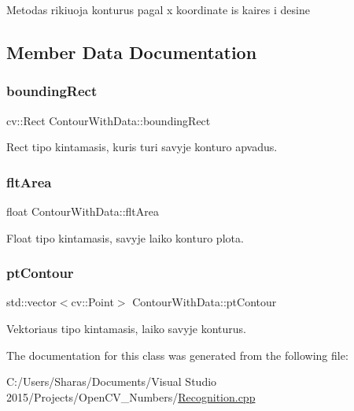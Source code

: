 Metodas rikiuoja konturus pagal x koordinate is kaires i desine 

\subsection{Member Data Documentation}
\mbox{\label{class_contour_with_data_ab2bebe42d7353d50fe515bd25c561247}} 
\subsubsection{\texorpdfstring{bounding\+Rect}{boundingRect}}
{\footnotesize\ttfamily cv\+::\+Rect Contour\+With\+Data\+::bounding\+Rect}



Rect tipo kintamasis, kuris turi savyje konturo apvadus. 

\mbox{\label{class_contour_with_data_a640536a3a32dd02f85e6a5f70ddfe7e3}} 
\subsubsection{\texorpdfstring{flt\+Area}{fltArea}}
{\footnotesize\ttfamily float Contour\+With\+Data\+::flt\+Area}



Float tipo kintamasis, savyje laiko konturo plota. 

\mbox{\label{class_contour_with_data_a28f63c52d8383623adc00e4481e6b9aa}} 
\subsubsection{\texorpdfstring{pt\+Contour}{ptContour}}
{\footnotesize\ttfamily std\+::vector$<$cv\+::\+Point$>$ Contour\+With\+Data\+::pt\+Contour}



Vektoriaus tipo kintamasis, laiko savyje konturus. 



The documentation for this class was generated from the following file\+:\begin{DoxyCompactItemize}
\item 
C\+:/\+Users/\+Sharas/\+Documents/\+Visual Studio 2015/\+Projects/\+Open\+C\+V\+\_\+\+Numbers/\hyperlink{_recognition_8cpp}{Recognition.\+cpp}\end{DoxyCompactItemize}
